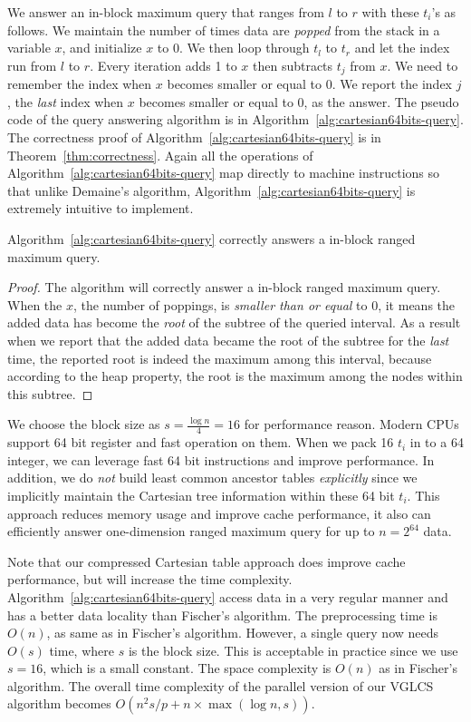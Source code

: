 We answer an in-block maximum query that ranges from $l$ to $r$ with
these $t_i$'s as follows.  We maintain the number of times data are
{\em popped} from the stack in a variable $x$, and initialize $x$ to
0.  We then loop through $t_l$ to $t_r$ and let the index run from $l$
to $r$.  Every iteration adds 1 to $x$ then subtracts $t_j$ from $x$.
We need to remember the index when $x$ becomes smaller or equal to 0.
We report the index $j$, the {\em last} index when $x$ becomes smaller
or equal to 0, as the answer.  The pseudo code of the query answering
algorithm is in Algorithm~\ref{alg:cartesian64bits-query}.  The
correctness proof of Algorithm~\ref{alg:cartesian64bits-query} is in
Theorem~\ref{thm:correctness}.  Again all the operations of
Algorithm~\ref{alg:cartesian64bits-query} map directly to machine
instructions so that unlike Demaine's algorithm,
Algorithm~\ref{alg:cartesian64bits-query} is extremely intuitive to
implement.

%



\begin{theorem} \label{thm:correctness}
  Algorithm~\ref{alg:cartesian64bits-query} correctly answers a
  in-block ranged maximum query.
\end{theorem}
\begin{proof}
The algorithm will correctly answer a in-block ranged maximum query.
When the $x$, the number of poppings, is {\em smaller than or equal}
to 0, it means the added data has become the {\em root} of the subtree
of the queried interval.  As a result when we report that the added
data became the root of the subtree for the {\em last} time, the
reported root is indeed the maximum among this interval, because
according to the heap property, the root is the maximum among the
nodes within this subtree.
\end{proof}

We choose the block size as $s = {{\frac{\log n}{4}}} = 16$ for
performance reason.  Modern CPUs support 64 bit register and fast
operation on them.  When we pack 16 $t_i$ in to a 64 integer, we can
leverage fast 64 bit instructions and improve performance.  In
addition, we do {\em not} build least common ancestor tables {\em
  explicitly} since we implicitly maintain the Cartesian tree
information within these 64 bit $t_i$.  This approach reduces memory
usage and improve cache performance, it also can efficiently answer
one-dimension ranged maximum query for up to $n = 2^{64}$ data.

Note that our compressed Cartesian table approach does improve cache
performance, but will increase the time complexity.
Algorithm~\ref{alg:cartesian64bits-query} access data in a very
regular manner and has a better data locality than Fischer's
algorithm.  The preprocessing time is $O(n)$, as same as in Fischer's
algorithm.  However, a single query now needs $O(s)$ time, where $s$
is the block size.  This is acceptable in practice since we use $s =
16$, which is a small constant.  The space complexity is $O(n)$ as in
Fischer's algorithm.  The overall time complexity of the parallel
version of our VGLCS algorithm becomes $O(n^2 s / p + n \times
\max(\log n, s))$.
